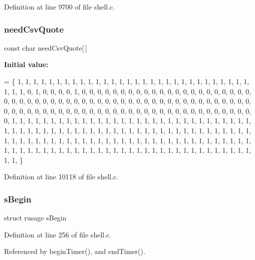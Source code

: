 Definition at line 9700 of file shell.\+c.

\mbox{\label{shell_8c_a643e1ab0a846cd5dc5f1fbf2cfe3078e}} 
\subsubsection{need\+Csv\+Quote}
{\footnotesize\ttfamily const char need\+Csv\+Quote[$\,$]\hspace{0.3cm}{\ttfamily [static]}}

{\bfseries Initial value\+:}
\begin{DoxyCode}
= \{
  1, 1, 1, 1, 1, 1, 1, 1,   1, 1, 1, 1, 1, 1, 1, 1,
  1, 1, 1, 1, 1, 1, 1, 1,   1, 1, 1, 1, 1, 1, 1, 1,
  1, 0, 1, 0, 0, 0, 0, 1,   0, 0, 0, 0, 0, 0, 0, 0,
  0, 0, 0, 0, 0, 0, 0, 0,   0, 0, 0, 0, 0, 0, 0, 0,
  0, 0, 0, 0, 0, 0, 0, 0,   0, 0, 0, 0, 0, 0, 0, 0,
  0, 0, 0, 0, 0, 0, 0, 0,   0, 0, 0, 0, 0, 0, 0, 0,
  0, 0, 0, 0, 0, 0, 0, 0,   0, 0, 0, 0, 0, 0, 0, 0,
  0, 0, 0, 0, 0, 0, 0, 0,   0, 0, 0, 0, 0, 0, 0, 1,
  1, 1, 1, 1, 1, 1, 1, 1,   1, 1, 1, 1, 1, 1, 1, 1,
  1, 1, 1, 1, 1, 1, 1, 1,   1, 1, 1, 1, 1, 1, 1, 1,
  1, 1, 1, 1, 1, 1, 1, 1,   1, 1, 1, 1, 1, 1, 1, 1,
  1, 1, 1, 1, 1, 1, 1, 1,   1, 1, 1, 1, 1, 1, 1, 1,
  1, 1, 1, 1, 1, 1, 1, 1,   1, 1, 1, 1, 1, 1, 1, 1,
  1, 1, 1, 1, 1, 1, 1, 1,   1, 1, 1, 1, 1, 1, 1, 1,
  1, 1, 1, 1, 1, 1, 1, 1,   1, 1, 1, 1, 1, 1, 1, 1,
  1, 1, 1, 1, 1, 1, 1, 1,   1, 1, 1, 1, 1, 1, 1, 1,
\}
\end{DoxyCode}


Definition at line 10118 of file shell.\+c.

\mbox{\label{shell_8c_a256978fb8ad6b4fe2eb4a02d112b1d4e}} 
\subsubsection{s\+Begin}
{\footnotesize\ttfamily struct rusage s\+Begin\hspace{0.3cm}{\ttfamily [static]}}



Definition at line 256 of file shell.\+c.



Referenced by begin\+Timer(), and end\+Timer().

\mbox{\label{shell_8c_aab9c23da2da2dda99ea4b2703d56331a}} 
